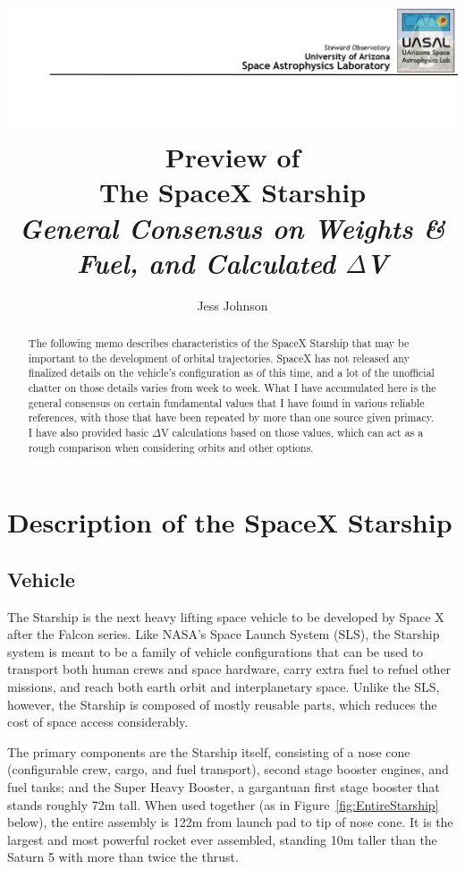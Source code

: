 \documentclass[11pt]{article}
\title{
    {\vspace{-1.5cm}}
    {\hspace{-2cm}}   
    {\includegraphics{assets/UASAL_Header.png}}
    {\large Preview of}\\
    {The SpaceX Starship}\\
    {\small \textit{General Consensus on Weights \& Fuel, and Calculated $\Delta$V}}
 }
\author{\large Jess Johnson}
\affil{\small Senior Instrumentation Scientist \\ Steward Observatory, University of Arizona \\ July 2023}
\date{}
\begin{document}
\maketitle


\begin{abstract}

The following memo describes characteristics of the SpaceX Starship that may be important to the development of orbital trajectories. SpaceX has not released any finalized details on the vehicle's configuration as of this time, and a lot of the unofficial chatter on those details varies from week to week. What I have accumulated here is the general consensus on certain fundamental values that I have found in various reliable references, with those that have been repeated by more than one source given primacy. I have also provided basic $\Delta$V calculations based on those values, which can act as a rough comparison when considering orbits and other options.

\end{abstract}

\newpage


\tableofcontents
\newpage


\section{Description of the SpaceX Starship}
\subsection{Vehicle}

The Starship is the next heavy lifting space vehicle to be developed by Space X after the Falcon series. Like NASA's Space Launch System (SLS), the Starship system is meant to be a family of vehicle configurations that can be used to transport both human crews and space hardware, carry extra fuel to refuel other missions, and reach both earth orbit and interplanetary space. Unlike the SLS, however, the Starship is composed of mostly reusable parts, which reduces the cost of space access considerably.

The primary components are the Starship itself, consisting of a nose cone (configurable crew, cargo, and fuel transport), second stage booster engines, and fuel tanks; and the Super Heavy Booster, a gargantuan first stage booster that stands roughly 72m tall. When used together (as in Figure~\ref{fig:EntireStarship} below), the entire assembly is 122m from launch pad to tip of nose cone. It is the largest and most powerful rocket ever assembled, standing 10m taller than the Saturn 5 with more than twice the thrust.\cite{website:law21}
\end{document}

